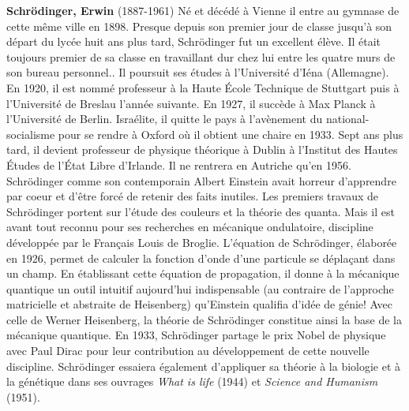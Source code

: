 \textbf{Schrödinger, Erwin} (1887-1961) Né et décédé à Vienne il entre au gymnase de cette même ville en 1898. Presque depuis son premier jour de classe jusqu'à son départ du lycée huit ans plus tard, Schrödinger fut un excellent élève. Il était toujours premier de sa classe en travaillant dur chez lui entre les quatre murs de son bureau personnel.. Il poursuit ses études à l'Université d'Iéna (Allemagne). En 1920, il est nommé professeur à la Haute École Technique de Stuttgart puis à l'Université de Breslau l'année suivante. En 1927, il succède à Max Planck à l'Université de Berlin. Israélite, il quitte le pays à l'avènement du national-socialisme pour se rendre à Oxford où il obtient une chaire en 1933. Sept ans plus tard, il devient professeur de physique théorique à Dublin à l'Institut des Hautes Études de l'État Libre d'Irlande. Il ne rentrera en Autriche qu'en 1956. Schrödinger comme son contemporain Albert Einstein avait horreur d'apprendre par coeur et d'être forcé de retenir des faits inutiles. Les premiers travaux de Schrödinger portent sur l'étude des couleurs et la théorie des quanta. Mais il est avant tout reconnu pour ses recherches en mécanique ondulatoire, discipline développée par le Français Louis de Broglie. L'équation de Schrödinger, élaborée en 1926, permet de calculer la fonction d'onde d'une particule se déplaçant dans un champ. En établissant cette équation de propagation, il donne à la mécanique quantique un outil intuitif aujourd'hui indispensable (au contraire de l'approche matricielle et abstraite de Heisenberg) qu'Einstein qualifia d'idée de génie! Avec celle de Werner Heisenberg, la théorie de Schrödinger constitue ainsi la base de la mécanique quantique. En 1933, Schrödinger partage le prix Nobel de physique avec Paul Dirac pour leur contribution au développement de cette nouvelle discipline. Schrödinger essaiera également d'appliquer sa théorie à la biologie et à la génétique dans ses ouvrages \textit{What is life} (1944) et \textit{Science and Humanism} (1951).

